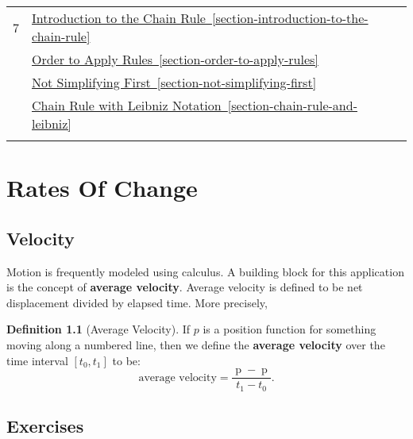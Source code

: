 \documentclass[12pt,]{book}
\newcommand{\terminology}[1]{\textbf{#1}}
\theoremstyle{plain}
\theoremstyle{definition}
\newtheorem{definition}[theorem]{Definition}
\numberwithin{equation}{section}
\newcommand{\hrulemedium}{\noalign{\hrule height 0.07em}}
\newcommand{\fe}[2]{\mathop{{#1}{\left(#2\right)}}}
\newcommand{\cinterval}[2]{\left[#1,#2\right]}
\begin{document}
\begin{longtable}{clc}
7&\hyperref[section-introduction-to-the-chain-rule]{Introduction to the Chain Rule~\ref*{section-introduction-to-the-chain-rule}}&\\
&\hyperref[section-order-to-apply-rules]{Order to Apply Rules~\ref*{section-order-to-apply-rules}}&\\
&\hyperref[section-not-simplifying-first]{Not Simplifying First~\ref*{section-not-simplifying-first}}&\\
&\hyperref[section-chain-rule-and-leibniz]{Chain Rule with Leibniz Notation~\ref*{section-chain-rule-and-leibniz}}&\\\hrulemedium
\end{longtable}
\mainmatter
\typeout{************************************************}
\typeout{************************************************}
\chapter[Rates Of Change]{Rates Of Change}\label{chapter-rates-of-change}
\typeout{************************************************}
\typeout{************************************************}
\section[Velocity]{Velocity}\label{section-velocity}
Motion is frequently modeled using calculus. A building block for this application is the concept of \terminology{average velocity}. Average velocity is defined to be net displacement divided by elapsed time.  More precisely,%
\begin{definition}[Average Velocity]\label{definition-average-velocity}
If \(p\) is a position function for something moving along a numbered line, then we define the \terminology{average velocity} over the time interval \(\cinterval{t_0}{t_1}\) to be: \[\text{average velocity}=\frac{\fe{p}{t_1}-\fe{p}{t_0}}{t_1-t_0}\text{.}\]%
\end{definition}
\typeout{************************************************}
\typeout{************************************************}
\section*{Exercises}\label{exercises-1}
\end{document}
